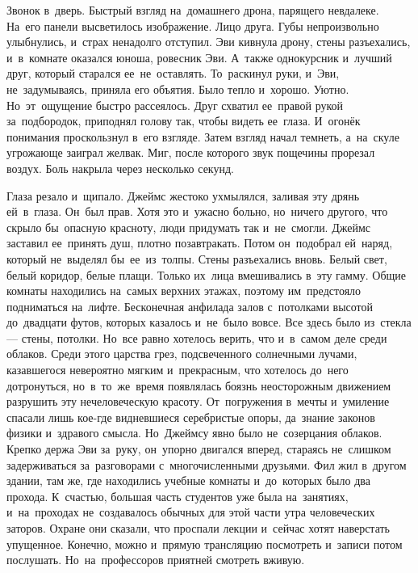 Звонок в~дверь.
Быстрый взгляд на~домашнего дрона, парящего невдалеке.
На~его панели высветилось изображение.
Лицо друга.
Губы непроизвольно улыбнулись, и~страх ненадолго отступил.
Эви кивнула дрону, стены разъехались, и~в~комнате оказался юноша, ровесник Эви.
А~также однокурсник и~лучший друг, который старался ее~не~оставлять.
То~раскинул руки, и~Эви, не~задумываясь, приняла его объятия.
Было тепло и~хорошо.
Уютно.
Но~эт~ощущение быстро рассеялось.
Друг схватил ее~правой рукой за~подбородок, приподнял голову так, чтобы видеть ее~глаза.
И~огонёк понимания проскользнул в~его взгляде.
Затем взгляд начал темнеть, а~на~скуле угрожающе заиграл желвак.
Миг, после которого звук пощечины прорезал воздух.
Боль накрыла через несколько секунд.
 
Глаза резало и~щипало.
Джеймс жестоко ухмылялся, заливая эту дрянь ей~в~глаза.
Он~был прав.
Хотя это и~ужасно больно, но~ничего другого, что скрыло бы~опасную красноту, люди придумать так и~не~смогли.
Джеймс заставил ее~принять душ, плотно позавтракать.
Потом он~подобрал ей~наряд, который не~выделял бы~ее~из~толпы.
Стены разъехались вновь.
Белый свет, белый коридор, белые плащи.
Только их~лица вмешивались в~эту гамму.
Общие комнаты находились на~самых верхних этажах, поэтому им~предстояло подниматься на~лифте.
Бесконечная анфилада залов с~потолками высотой до~двадцати футов, которых казалось и~не~было вовсе.
Все здесь было из~стекла --- стены, потолки.
Но~все равно хотелось верить, что и~в~самом деле среди облаков.
Среди этого царства грез, подсвеченного солнечными лучами, казавшегося невероятно мягким и~прекрасным, что хотелось до~него дотронуться, но~в~то~же~время появлялась боязнь неосторожным движением разрушить эту нечеловеческую красоту.
От~погружения в~мечты и~умиление спасали лишь кое-где видневшиеся серебристые опоры, да~знание законов физики и~здравого смысла.
Но~Джеймсу явно было не~созерцания облаков.
Крепко держа Эви за~руку, он~упорно двигался вперед, стараясь не~слишком задерживаться за~разговорами с~многочисленными друзьями.
Фил жил в~другом здании, там же, где находились учебные комнаты и~до~которых было два прохода.
К~счастью, большая часть студентов уже была на~занятиях, и~на~проходах не~создавалось обычных для этой части утра человеческих заторов.
Охране они сказали, что проспали лекции и~сейчас хотят наверстать упущенное.
Конечно, можно и~прямую трансляцию посмотреть и~записи потом послушать.
Но~на~профессоров приятней смотреть вживую.
 

